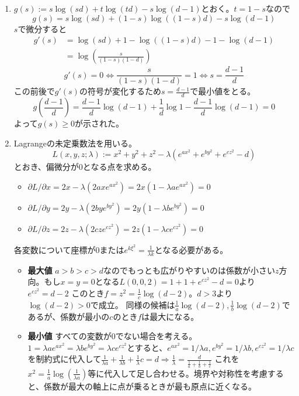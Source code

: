 \documentclass[dvipdfmx]{jsreport}
\begin{document}
\begin{souanswer}
\begin{enumerate}
	\item $g(s):= s\log{(sd)}+ t\log{(td)}- s\log{(d- 1)}$とおく。$t= 1- s$なので
\begin{equation*}
	g(s)= s\log{(sd)}+ (1- s)\log{((1- s)d)}- s\log{(d- 1)}
\end{equation*}
	$s$で微分すると
\begin{align*}
	g'(s)
	&= \log{(sd)}+ 1- \log{((1- s)d)}- 1- \log{(d- 1)}\\
	&= \log{\left(\frac{s}{(1- s)(1- d)}\right)}
\end{align*}
\begin{equation*}
	g'(s)= 0\iff \frac{s}{(1- s)(1- d)}= 1\iff s= \frac{d- 1}{d}
\end{equation*}
	この前後で$g'(s)$の符号が変化するため$s= \frac{d- 1}{d}$で最小値をとる。
\begin{equation*}
	g\left(\frac{d- 1}{d}\right)= \frac{d- 1}{d}\log{(d- 1)}+ \frac{1}{d}\log{1}- \frac{d- 1}{d}\log{(d- 1)}= 0
\end{equation*}
	よって$g(s)\ge 0$が示された。
	\item Lagrangeの未定乗数法を用いる。
\begin{equation*}
	L(x, y, z; \lambda):= x^2+ y^2+ z^2- \lambda(e^{ax^2}+ e^{by^2}+ e^{cz^2}- d)
\end{equation*}
	とおき、偏微分が0となる点を求める。
\begin{itemize}
	\item ${\partial L}/{\partial x}= 2x- \lambda(2axe^{ax^2})= 2x(1- \lambda ae^{ax^2})= 0$
	\item ${\partial L}/{\partial y}= 2y- \lambda(2bye^{by^2})= 2y(1- \lambda be^{by^2})= 0$
	\item ${\partial L}/{\partial z}= 2z- \lambda(2cze^{cz^2})= 2z(1- \lambda ce^{cz^2})= 0$
\end{itemize}
	各変数について座標が0または$e^{k\xi^2}= \frac{1}{\lambda k}$となる必要がある。%
\begin{itemize}
	\item \textbf{最大値} $a> b> c> d$なのでもっとも広がりやすいのは係数が小さい$z$方向。もし$x= y= 0$となる$L(0, 0, 2)= 1+ 1+ e^{cz^2}-d= 0$より$e^{cz^2}= d- 2$
	このとき$f= z^2= \frac{1}{c}\log{(d- 2)}$。$d> 3$より$\log{(d- 2)}> 0$で成立。
	同様の候補は$\frac{1}{a}\log{(d- 2)}, \frac{1}{b}\log{(d- 2)}$であるが、係数が最小の$c$のとき$f$は最大になる。
	\item \textbf{最小値} すべての変数が0でない場合を考える。$1= \lambda ae^{ax^2}= \lambda be^{by^2}= \lambda ce^{cz^2}$とすると、$e^{ax^2}= 1/\lambda a, e^{by^2}= 1/\lambda b, e^{cz^2}= 1/\lambda c$を制約式に代入して$\frac{1}{\lambda a}+ \frac{1}{\lambda b}+ \frac{1}{\lambda} c= d\Rightarrow \frac{1}{\lambda}= \frac{d}{\frac{1}{a}+ \frac{1}{b}+ \frac{1}{c}}$
	これを$x^2= \frac{1}{a}\log{\left(\frac{1}{\lambda a}\right)}$等に代入して足し合わせる。境界や対称性を考慮すると、係数が最大の軸上に点が乗るときが最も原点に近くなる。
\end{itemize}
\end{enumerate}
\end{souanswer}
\end{document}
